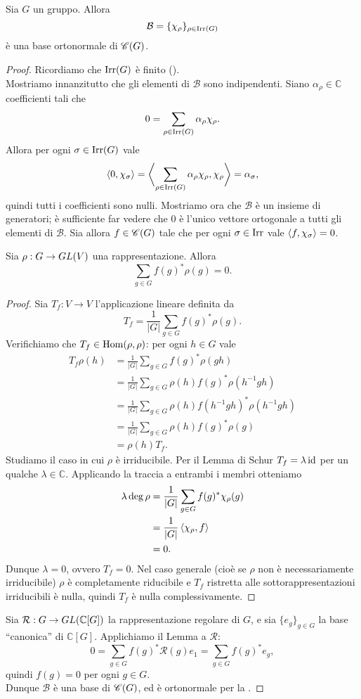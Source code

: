 \begin{proposition}
Sia $G$ un gruppo. Allora
$$
\mathcal{B}=\{\chi_\rho\}_{\rho\in\operatorname{Irr}(G)}
$$
è una base ortonormale di $\mathscr{C}(G)$.
\end{proposition}
\begin{proof}
Ricordiamo che $\operatorname{Irr}(G)$ è finito ().\\
Mostriamo innanzitutto che gli elementi di $\mathcal{B}$ sono indipendenti. Siano $\alpha_\rho\in\mathbb{C}$ coefficienti tali che
$$
0=\sum_{\rho\in\operatorname{Irr}(G)}\alpha_\rho\chi_\rho.
$$
Allora per ogni $\sigma\in\operatorname{Irr}(G)$ vale
$$
\left\langle0,\chi_\sigma\right\rangle=\biggl\langle\sum_{\rho\in\operatorname{Irr}(G)}\alpha_\rho\chi_\rho,\chi_\rho\biggr\rangle=\alpha_\sigma,
$$
quindi tutti i coefficienti sono nulli. Mostriamo ora che $\mathcal{B}$ è un insieme di generatori; è sufficiente far vedere che $0$ è l'unico vettore ortogonale a tutti gli elementi di $\mathcal{B}$. Sia allora $f\in\mathscr{C}(G)$ tale che per ogni $\sigma\in\operatorname{Irr}$ vale $\left\langle f,\chi_\sigma\right\rangle=0$.

\begin{lemma*}
Sia $\rho:G\to GL(V)$ una rappresentazione. Allora
$$
\sum_{g\in G}f(g)^*\rho(g)=0.
$$
\end{lemma*}
\begin{proof}
Sia $T_f:V\to V$ l'applicazione lineare definita da
$$
T_f=\frac{1}{|G|}\sum_{g\in G}f(g)^*\rho(g).
$$
Verifichiamo che $T_f\in\operatorname{Hom}(\rho,\rho)$: per ogni $h\in G$ vale
\begin{align*}
T_f\rho(h)&=\frac{1}{|G|}\sum_{g\in G}f(g)^*\rho(gh)\\
&=\frac{1}{|G|}\sum_{g\in G}\rho(h)f(g)^*\rho(h^{-1}gh)\\
&=\frac{1}{|G|}\sum_{g\in G}\rho(h)f(h^{-1}gh)^*\rho(h^{-1}gh)\\
&=\frac{1}{|G|}\sum_{g\in G}\rho(h)f(g)^*\rho(g)\\
&=\rho(h)T_f.
\end{align*}
Studiamo il caso in cui $\rho$ è irriducibile. Per il Lemma di Schur $T_f=\lambda\operatorname{id}$ per un qualche $\lambda\in\mathbb{C}$. Applicando la traccia a entrambi i membri otteniamo
\begin{align*}
\lambda\deg\rho&=\frac{1}{|G|}\sum_{g\in G}f(g)^*\chi_\rho(g)\\
&=\frac{1}{|G|}\left\langle\chi_{\rho},f\right\rangle\\
&=0.
\end{align*}
Dunque $\lambda=0$, ovvero $T_f=0$. Nel caso generale (cioè se $\rho$ non è necessariamente irriducibile) $\rho$ è completamente riducibile e $T_f$ ristretta alle sottorappresentazioni irriducibili è nulla, quindi $T_f$ è nulla complessivamente.
\end{proof}
Sia $\mathcal{R}:G\to GL(\mathbb{C}[G])$ la rappresentazione regolare di $G$, e sia $\{e_g\}_{g\in G}$ la base ``canonica'' di $\mathbb{C}[G]$. Applichiamo il Lemma a $\mathcal{R}$: 
$$
0=\sum_{g\in G}f(g)^*\mathcal{R}(g)e_1=\sum_{g\in G}f(g)^*e_g,
$$
quindi $f(g)=0$ per ogni $g\in G$.\\
Dunque $\mathcal{B}$ è una base di $\mathscr{C}(G)$, ed è ortonormale per la .
\end{proof}

